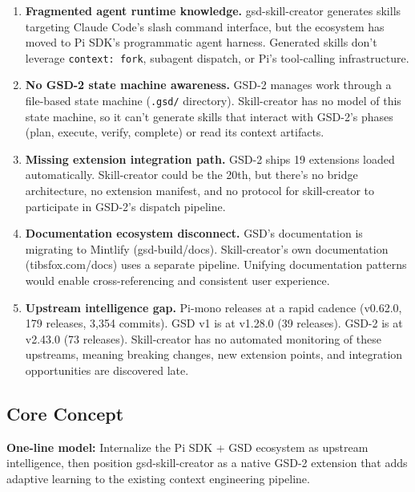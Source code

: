 \documentclass[11pt,letterpaper]{article}
\begin{document}
\begin{enumerate}[leftmargin=2em]
\item \textbf{Fragmented agent runtime knowledge.} gsd-skill-creator generates skills targeting Claude Code's slash command interface, but the ecosystem has moved to Pi SDK's programmatic agent harness. Generated skills don't leverage \texttt{context: fork}, subagent dispatch, or Pi's tool-calling infrastructure.

\item \textbf{No GSD-2 state machine awareness.} GSD-2 manages work through a file-based state machine (\texttt{.gsd/} directory). Skill-creator has no model of this state machine, so it can't generate skills that interact with GSD-2's phases (plan, execute, verify, complete) or read its context artifacts.

\item \textbf{Missing extension integration path.} GSD-2 ships 19 extensions loaded automatically. Skill-creator could be the 20th, but there's no bridge architecture, no extension manifest, and no protocol for skill-creator to participate in GSD-2's dispatch pipeline.

\item \textbf{Documentation ecosystem disconnect.} GSD's documentation is migrating to Mintlify (gsd-build/docs). Skill-creator's own documentation (tibsfox.com/docs) uses a separate pipeline. Unifying documentation patterns would enable cross-referencing and consistent user experience.

\item \textbf{Upstream intelligence gap.} Pi-mono releases at a rapid cadence (v0.62.0, 179 releases, 3,354 commits). GSD v1 is at v1.28.0 (39 releases). GSD-2 is at v2.43.0 (73 releases). Skill-creator has no automated monitoring of these upstreams, meaning breaking changes, new extension points, and integration opportunities are discovered late.
\end{enumerate}

\subsection{Core Concept}

\begin{quotebox}
\textbf{One-line model:} Internalize the Pi SDK + GSD ecosystem as upstream intelligence, then position gsd-skill-creator as a native GSD-2 extension that adds adaptive learning to the existing context engineering pipeline.
\end{quotebox}
\end{document}
